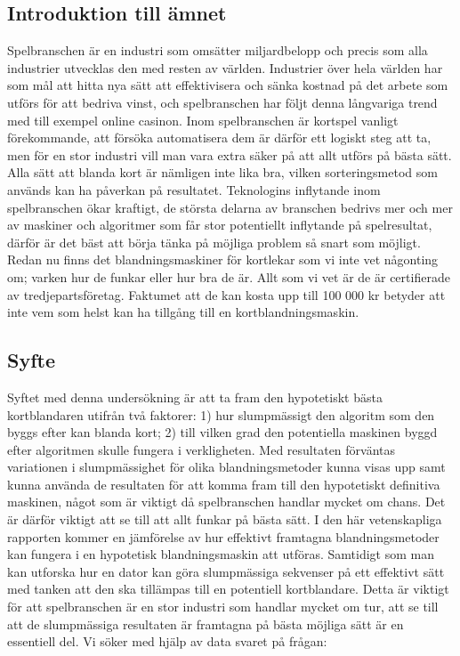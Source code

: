 \documentclass[swedish,a4paper]{article}
\begin{document}
\subsection{Introduktion till ämnet}
Spelbranschen är en industri som omsätter miljardbelopp och precis som alla
industrier utvecklas den med resten av världen. Industrier över hela världen har
som mål att hitta nya sätt att effektivisera och sänka kostnad på det arbete som
utförs för att bedriva vinst, och spelbranschen har följt denna långvariga trend
med till exempel online casinon. Inom spelbranschen är kortspel vanligt
förekommande, att försöka automatisera dem är därför ett logiskt steg att ta, men för
en stor industri vill man vara extra säker på att allt utförs på bästa sätt.
Alla sätt att blanda kort är nämligen inte lika bra, vilken sorteringsmetod som
används kan ha påverkan på resultatet. Teknologins inflytande inom spelbranschen
ökar kraftigt, de största delarna av branschen bedrivs mer och mer av maskiner
och algoritmer som får stor potentiellt inflytande på spelresultat, därför är
det bäst att börja tänka på möjliga problem så snart som möjligt. Redan nu finns
det blandningsmaskiner för kortlekar som vi inte vet någonting om; varken hur de
funkar eller hur bra de är. Allt som vi vet är de är certifierade av
tredjepartsföretag. Faktumet att de kan kosta upp till 100 000 kr betyder att
inte vem som helst kan ha tillgång till en kortblandningsmaskin.

\subsection{Syfte}
\label{sec:purpose}
Syftet med denna undersökning är att ta fram den hypotetiskt bästa kortblandaren
utifrån två faktorer: 1) hur slumpmässigt den algoritm som den byggs efter kan
blanda kort; 2) till vilken grad den potentiella maskinen byggd efter algoritmen
skulle fungera i verkligheten. Med resultaten förväntas variationen i
slumpmässighet för olika blandningsmetoder kunna visas upp samt kunna använda de
resultaten för att komma fram till den hypotetiskt definitiva maskinen, något
som är viktigt då spelbranschen handlar mycket om chans. Det är därför viktigt
att se till att allt funkar på bästa sätt. I den här vetenskapliga rapporten
kommer en jämförelse av hur effektivt framtagna blandningsmetoder kan fungera i
en hypotetisk blandningsmaskin att utföras. Samtidigt som man kan utforska hur
en dator kan göra slumpmässiga sekvenser på ett effektivt sätt med tanken att
den ska tillämpas till en potentiell kortblandare. Detta är viktigt för att
spelbranschen är en stor industri som handlar mycket om tur, att se till att de
slumpmässiga resultaten är framtagna på bästa möjliga sätt är en essentiell del.
Vi söker med hjälp av data svaret på frågan:
\end{document}
